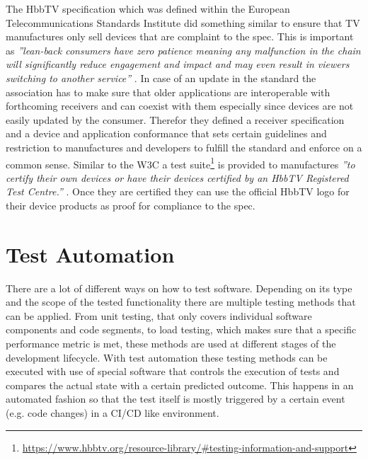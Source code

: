 The HbbTV specification which was defined within the European Telecommunications Standards Institute did something similar to ensure that TV manufactures only sell devices that are complaint to the spec. This is important as \textit{''lean-back consumers have zero patience meaning any malfunction in the chain will significantly reduce engagement and impact and may even result in viewers switching to another service''} \cite{hbbtvtesting}. In case of an update in the standard the association has to make sure that older applications are interoperable with forthcoming receivers and can coexist with them especially since devices are not easily updated by the consumer. Therefor they defined a receiver specification and a device and application conformance that sets certain guidelines and restriction to manufactures and developers to fulfill the standard and enforce on a common sense. Similar to the W3C a test suite\footnote{\url{https://www.hbbtv.org/resource-library/#testing-information-and-support}} is provided to manufactures \textit{''to certify their own devices or have their devices certified by an HbbTV Registered Test Centre.''} \cite{hbbtvtesting}. Once they are certified they can use the official HbbTV logo for their device products as proof for compliance to the spec.

\section{Test Automation\label{sec:testautomation}}

There are a lot of different ways on how to test software. Depending on its type and the scope of the tested functionality there are multiple testing methods that can be applied. From unit testing, that only covers individual software components and code segments, to load testing, which makes sure that a specific performance metric is met, these methods are used at different stages of the development lifecycle. With test automation these testing methods can be executed with use of special software that controls the execution of tests and compares the actual state with a certain predicted outcome. This happens in an automated fashion so that the test itself is mostly triggered by a certain event (e.g. code changes) in a CI/CD like environment.

